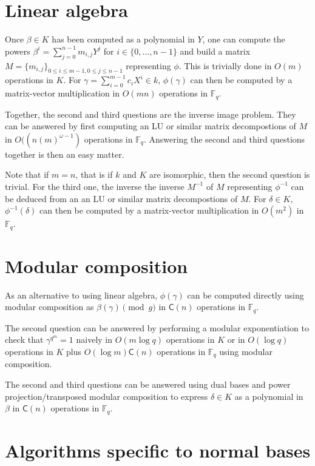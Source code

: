 \documentclass[12pt]{article}
\theoremstyle{plain}
\theoremstyle{definition}
\def\F{\ensuremath{\mathbb{F}}}
\def\CC{\ensuremath{\mathsf{C}}}
\begin{document}
\section{Linear algebra}

Once $\beta \in K$ has been computed as a polynomial in $Y$,
one can compute the powers
$\beta^i = \sum_{j=0}^{n-1} m_{i,j} Y^j$
for $i \in \{0, \ldots, n-1\}$ and build a matrix
$M = \{m_{i, j}\}_{0\leq i \leq m-1, 0 \leq j \leq n -1}$
representing $\phi$.
This is trivially done in $O(m)$ operations in $K$.
For $\gamma = \sum_{i = 0}^{m - 1} c_i X^i \in k$,
$\phi(\gamma)$ can then be computed by a
matrix-vector multiplication in $O(m n)$ operations in $\F_q$.

Together, the second and third questions are the inverse image problem.
They can be answered by first computing 
an LU or similar matrix decompostions of $M$
in $O((n (m)^{\omega - 1})$ operations in $\F_q$.
Answering the second and third questions together is then
an easy matter.

Note that if $m = n$, that is if $k$ and $K$ are
isomorphic, then the second question is trivial.
For the third one, the inverse
the inverse $M^{-1}$ of $M$ representing $\phi^{-1}$
can be deduced from an an LU or similar matrix decompostions of $M$.
For $\delta \in K$, $\phi^{-1}(\delta)$ can then be computed by a
matrix-vector multiplication in $O(m^2)$ in $\F_q$.

\section{Modular composition}

As an alternative to using linear algebra,
$\phi(\gamma)$ can be computed directly using modular composition
as $\beta(\gamma) \pmod{g}$ in $\CC(n)$ operations in $\F_q$.

The second question can be answered by performing a modular
exponentiation to check that $\gamma^{q^{m}} = 1$
naively in $O(m \log q)$ operations in $K$
or in $O(\log q)$ operations in $K$ plus
$O(\log m) \CC(n)$ operations in $\F_q$ using modular composition.

The second and third questions can be answered using
dual bases and power projection/transposed modular composition
to express $\delta \in K$ as a polynomial in $\beta$ in
$\CC(n)$ operations in $\F_q$.



\section{Algorithms specific to normal bases}
\end{document}
